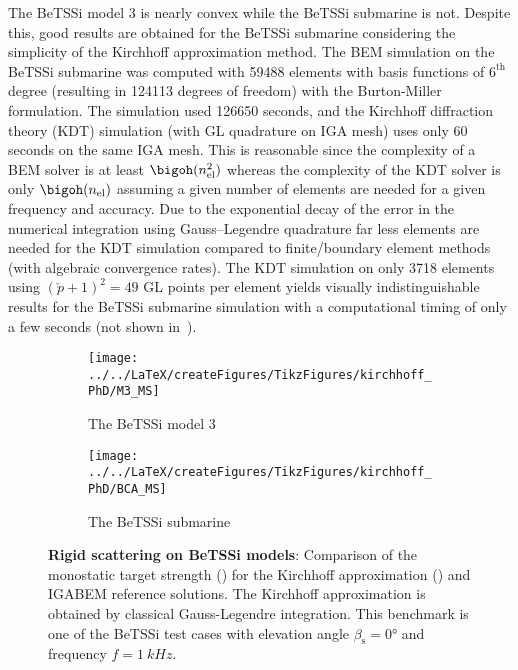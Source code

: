 The BeTSSi model 3 is nearly convex while the BeTSSi submarine is not. Despite this, good results are obtained for the BeTSSi submarine considering the simplicity of the Kirchhoff approximation method. The BEM simulation on the BeTSSi submarine was computed with \num{59488} elements with basis functions of $6^{\mathrm{th}}$ degree (resulting in \num{124113} degrees of freedom) with the Burton-Miller formulation. The simulation used \num{126650} seconds, and the Kirchhoff diffraction theory (KDT) simulation (with GL quadrature on IGA mesh) uses only \num{60} seconds on the same IGA mesh. This is reasonable since the complexity of a BEM solver is at least $\bigoh(n_{\mathrm{el}}^2)$ whereas the complexity of the KDT solver is only $\bigoh(n_{\mathrm{el}})$ assuming a given number of elements are needed for a given frequency and accuracy. Due to the exponential decay of the error in the numerical integration using Gauss--Legendre quadrature far less elements are needed for the KDT simulation compared to finite/boundary element methods (with algebraic convergence rates). The KDT simulation on only 3718 elements using $(\check{p}+1)^2=49$ GL points per element yields visually indistinguishable results for the BeTSSi submarine simulation with a computational timing of only a few seconds (not shown in~).
\begin{figure}
	\centering
	\begin{subfigure}{\textwidth}
		\centering
		\texttt{[image: ../../LaTeX/createFigures/TikzFigures/kirchhoff\_PhD/M3\_MS]}
		\caption{The BeTSSi model 3}
	\end{subfigure}
	\par\bigskip
	\par\bigskip
	\begin{subfigure}{\textwidth}
		\centering
		\texttt{[image: ../../LaTeX/createFigures/TikzFigures/kirchhoff\_PhD/BCA\_MS]}
		\caption{The BeTSSi submarine}
	\end{subfigure}
	\caption{\textbf{Rigid scattering on BeTSSi models}: Comparison of the monostatic target strength () for the Kirchhoff approximation () and IGABEM reference solutions. The Kirchhoff approximation is obtained by classical Gauss-Legendre integration. This benchmark is one of the BeTSSi test cases with elevation angle $\beta_{\mathrm{s}}=\ang{0}$ and frequency $f=\SI{1}{kHz}$.}
	\label{Fig4:BeTSSiresults}
\end{figure}

